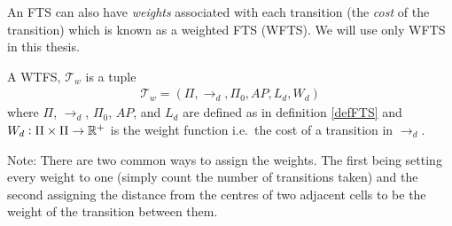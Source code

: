 An FTS can also have \textit{weights} associated with each transition (the \textit{cost} of the transition) which is known as a weighted FTS (WFTS). We will use only WFTS in this thesis.
\begin{definition}
\label{defWFTS}
A WTFS, $\mathcal{T}_w$ is a tuple 
\begin{align}
\mathcal{T}_w = (\Pi, \rightarrow_d, \Pi_0, AP,L_d,W_d)
\end{align}
where $\Pi$, $\rightarrow_d$, $\Pi_0$, $AP$, and $L_d$ are defined as in definition \ref{defFTS} and $W_d: \Pi \times \Pi \rightarrow \mathbb{R}^+$ is the weight function i.e.\ the cost of a transition in $\rightarrow_d$. 
\end{definition}
Note: There are two common ways to assign the weights. The first being setting every weight to one (simply count the number of transitions taken) and the second assigning the distance from the centres of two adjacent cells to be the weight of the transition between them. 

